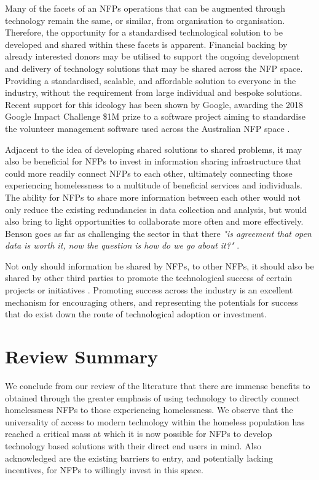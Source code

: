 Many of the facets of an NFPs operations that can be augmented through technology remain the same, or similar, from organisation to organisation. Therefore, the opportunity for a standardised technological solution to be developed and shared within these facets is apparent. Financial backing by already interested donors may be utilised to support the ongoing development and delivery of technology solutions that may be shared across the NFP space. Providing a standardised, scalable, and affordable solution to everyone in the industry, without the requirement from large individual and bespoke solutions. Recent support for this ideology has been shown by Google, awarding the 2018 Google Impact Challenge \$1M prize to a software project aiming to standardise the volunteer management software used across the Australian NFP space \cite{osa2018}.

Adjacent to the idea of developing shared solutions to shared problems, it may also be beneficial for NFPs to invest in information sharing infrastructure that could more readily connect NFPs to each other, ultimately connecting those experiencing homelessness to a multitude of beneficial services and individuals. The ability for NFPs to share more information between each other would not only reduce the existing redundancies in data collection and analysis, but would also bring to light opportunities to collaborate more often and more effectively. Benson goes as far as challenging the sector in that there \emph{"is agreement that open data is worth it, now the question is how do we go about it?"} \cite{van2015open}.

Not only should information be shared by NFPs, to other NFPs, it should also be shared by other third parties to promote the technological success of certain projects or initiatives \cite{van2015open}. Promoting success across the industry is an excellent mechanism for encouraging others, and representing the potentials for success that do exist down the route of technological adoption or investment.

\section{Review Summary}

We conclude from our review of the literature that there are immense benefits to obtained through the greater emphasis of using technology to directly connect homelessness NFPs to those experiencing homelessness. We observe that the universality of access to modern technology within the homeless population has reached a critical mass at which it is now possible for NFPs to develop technology based solutions with their direct end users in mind. Also acknowledged are the existing barriers to entry, and potentially lacking incentives, for NFPs to willingly invest in this space.

